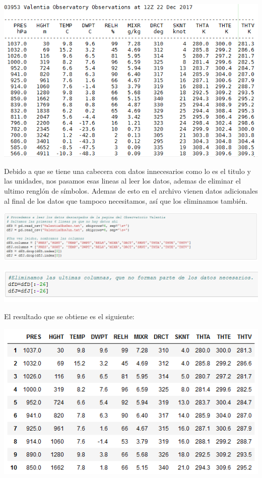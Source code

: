 \documentclass[12pt]{article}
\begin{document}
\begin{center}
\includegraphics[scale=0.7]{Datos.png}
\end{center}

Debido a que se tiene una cabecera con datos innecesarios como lo es el titulo y las unidades, nos pasamos esas lineas al leer los datos, ademas de eliminar el ultimo renglón de símbolos. Ademas de esto en el archivo vienen datos adicionales al final de los datos que tampoco necesitamos, así que los eliminamos también. 

\begin{center}
\includegraphics[scale=0.65]{AnaDatos.png}
\end{center}

\begin{center}
\includegraphics[scale=0.65]{Elim.png}
\end{center}

El resultado que se obtiene es el siguiente:

\begin{center}
\includegraphics[scale=0.65]{AnaDatosResul.png}
\end{center}
\end{document}

